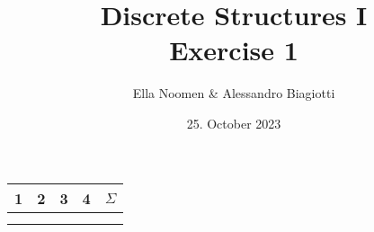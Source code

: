 \documentclass{article}
\title{Discrete Structures I \\ Exercise 1}
\author{Ella Noomen \& Alessandro Biagiotti}
\date{25. October 2023}
\begin{document}
\maketitle
\begin{center}
    \begin{tabular}{|c|c|c|c|c|}
        \hline
        1 & 2 & 3 & 4 & $\Sigma$ \\
        \hline
        & & & & \\
        & & & & \\
        \hline
    \end{tabular}
\end{center}




\end{document}

